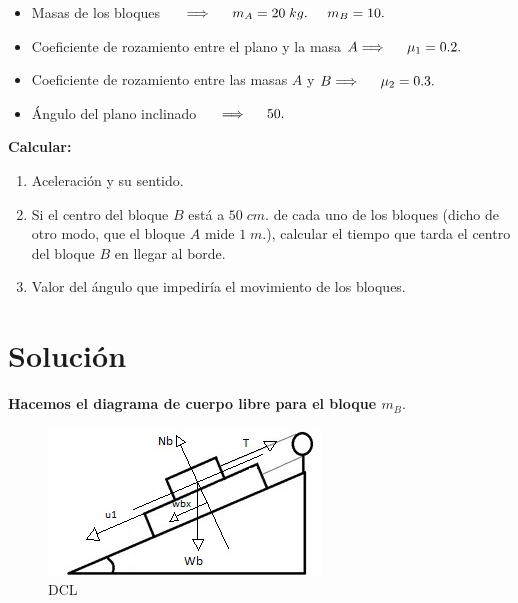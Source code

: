 \documentclass[a4paper,12pt]{article} %
\begin{document}
\begin{itemize}
    \item Masas de los bloques \(\hspace{0.5 cm}  \Longrightarrow  \hspace{0.5 cm} m_A = 20 \; kg. \hspace{0.5 cm} m_B = 10.\)
    \item Coeficiente  de rozamiento entre el plano y la masa \(A  \Longrightarrow \hspace{0.5 cm} \mu_1 = 0.2.\)
    \item Coeficiente de rozamiento entre las masas \(A\) y \(B   \Longrightarrow  \hspace{0.5 cm} \mu_2 = 0.3.\)
    \item Ángulo del plano inclinado \(\hspace{0.5 cm} \Longrightarrow \hspace{0.5 cm} 50.\)
\end{itemize}

\begin{justify}
    \textbf{Calcular:}
\end{justify}

\begin{enumerate}
    \item Aceleración y su sentido.
    \item Si el centro del bloque \(B\) está a \(50 \; cm.\) de cada uno de los bloques (dicho de otro modo, que el bloque \(A\) mide \(1 \; m.\)), calcular el tiempo que tarda el centro del bloque \(B\) en llegar al borde.
    \item Valor del ángulo que impediría el movimiento de los bloques. 
\end{enumerate}

\newpage

\section*{Solución}

\begin{justify}
    \textbf{Hacemos el diagrama de cuerpo libre para el bloque \(m_B.\)}
\end{justify}

\begin{figure}[h!]
    \centering
    \includegraphics[width=\textwidth]{Bloque b.jpg}
    \caption{DCL}
\end{figure}
\end{document}
